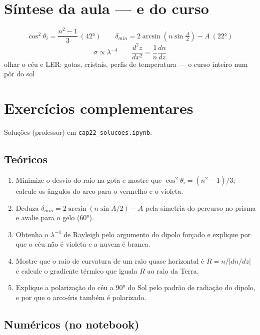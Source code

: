 \documentclass[11pt]{article}
\begin{document}
\section{Síntese da aula --- e do curso}

\begin{noquadro}
\[ \cos^2\theta_i = \frac{n^2-1}{3}\ (42°) \qquad
\delta_{min} = 2\arcsin(n\sin\tfrac{A}{2}) - A\ (22°) \]
\[ \sigma \propto \lambda^{-4} \qquad
\frac{d^2z}{dx^2} = \frac{1}{n}\frac{dn}{dz} \]
olhar o céu e LER: gotas, cristais, perfis de temperatura — o curso
inteiro num pôr do sol
\end{noquadro}

\section{Exercícios complementares}\label{sec:exercicios}

Soluções (professor) em \texttt{cap22\_solucoes.ipynb}.

\subsection*{Teóricos}

\begin{enumerate}[label=\textbf{T\arabic*.},itemsep=4pt]
  \item Minimize o desvio do raio na gota e mostre que
        $\cos^2\theta_i = (n^2-1)/3$; calcule os ângulos do arco para
        o vermelho e o violeta.
  \item Deduza $\delta_{min} = 2\arcsin(n\sin A/2) - A$ pela simetria
        do percurso no prisma e avalie para o gelo (60°).
  \item Obtenha o $\lambda^{-4}$ de Rayleigh pelo argumento do dipolo
        forçado e explique por que o céu não é violeta e a nuvem é
        branca.
  \item Mostre que o raio de curvatura de um raio quase horizontal é
        $R = n/|dn/dz|$ e calcule o gradiente térmico que iguala $R$
        ao raio da Terra.
  \item Explique a polarização do céu a 90° do Sol pelo padrão de
        radiação do dipolo, e por que o arco-íris também é
        polarizado.
\end{enumerate}

\subsection*{Numéricos (no notebook)}
\end{document}
